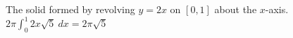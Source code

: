 {The solid formed by revolving $y=2x$ on $[0,1]$ about the $x$-axis.}
{$2\pi\int_0^1 2x\sqrt{5}\ dx = 2\pi\sqrt{5}$}
